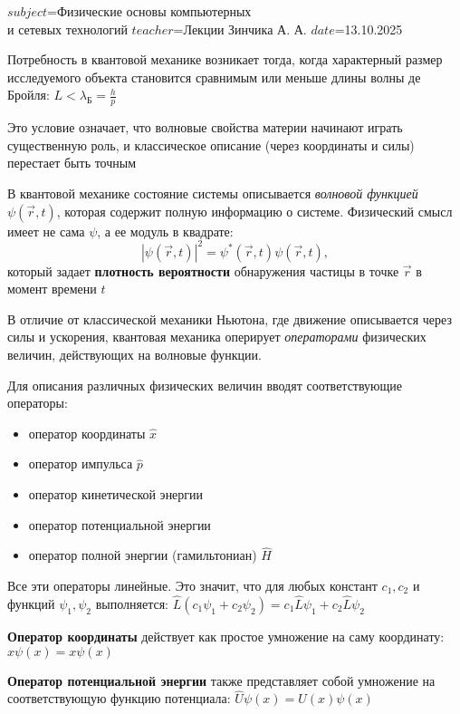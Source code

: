 $subject$=Физические основы компьютерных \\ и сетевых технологий
$teacher$=Лекции Зинчика А. А.
$date$=13.10.2025


Потребность в квантовой механике возникает тогда, когда характерный размер исследуемого объекта становится сравнимым или меньше длины волны де Бройля: $L < \lambda_{\text{Б}} = \frac{h}{p}$

Это условие означает, что волновые свойства материи начинают играть существенную роль, и классическое описание (через координаты и силы) перестает быть точным

\mediumvspace

В квантовой механике состояние системы описывается \textit{волновой функцией} $\psi(\vec r, t)$, которая содержит полную информацию о системе.  
Физический смысл имеет не сама $\psi$, а ее модуль в квадрате:
\[
|\psi(\vec r, t)|^2 = \psi^*(\vec r, t)\psi(\vec r, t),
\]
который задает \textbf{плотность вероятности} обнаружения частицы в точке $\vec r$ в момент времени $t$

\mediumvspace

В отличие от классической механики Ньютона, где движение описывается через силы и ускорения, квантовая механика оперирует \textit{операторами} физических величин, действующих на волновые функции.  

Для описания различных физических величин вводят соответствующие операторы:

\begin{itemize}
    \item оператор координаты $\hat{x}$
    \item оператор импульса $\hat{p}$
    \item оператор кинетической энергии
    \item оператор потенциальной энергии
    \item оператор полной энергии (гамильтониан) $\hat{H}$
\end{itemize}

Все эти операторы линейные. Это значит, что для любых констант $c_1, c_2$ и функций $\psi_1, \psi_2$ выполняется: $\hat{L}(c_1 \psi_1 + c_2 \psi_2) = c_1 \hat{L}\psi_1 + c_2 \hat{L}\psi_2$


\textbf{Оператор координаты} действует как простое умножение на саму координату: $\hat{x}\psi(x) = x\psi(x)$

\textbf{Оператор потенциальной энергии} также представляет собой умножение на соответствующую функцию потенциала: $\hat{U}\psi(x) = U(x)\psi(x)$

